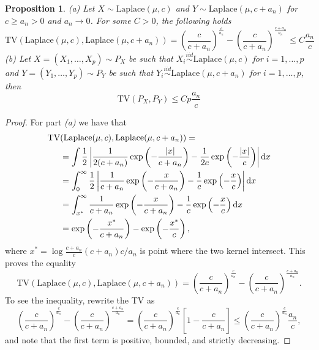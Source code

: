 \documentclass{article}
\newtheorem{proposition}{Proposition}
\theoremstyle{definition}
\newcommand{\iidsim}{\overset{iid}{\sim}} %
\newcommand{\di}{{\rm d}}
\renewcommand{\&}{and}
\begin{document}
\begin{proposition}\label{prop:tv_laplace} \textit{(a)} Let $X\sim\text{Laplace}(\mu,c)$ and $Y\sim \text{Laplace}(\mu,c+a_n)$ for $c\geq a_n>0$ and $a_n \to 0$. For some $C>0$, the following holds
\[
\text{TV} (\text{Laplace}(\mu,c),\text{Laplace}(\mu,c+a_n)) = \left(\frac{c}{c+a_n}\right)^{\frac{c}{a_n}}-\left(\frac{c}{c+a_n}\right)^{\frac{c+a_n}{a_n}} \leq C\frac{a_n}{c}
\]  
\textit{(b)} Let $X=(X_1,\ldots, X_p) \sim P_X$ be such that $X_i\iidsim \text{Laplace}(\mu,c)$ for $i=1,\ldots,p$ and $Y=(Y_1,\ldots, Y_p)\sim P_Y$ be such that $Y_i\iidsim \text{Laplace}(\mu,c+a_n)$ for $i=1,\ldots,p$, then 
\[
\text{TV} (P_X,P_Y) \leq C p \frac{a_n}{c}
\]
\end{proposition}
\begin{proof} For part \textit{(a)} we have that
\begin{align*}
   \text{TV} &(\text{Laplace}(\mu,c),\text{Laplace}(\mu,c+a_n))  =\\
  & =\int\frac{1}{2}\left\vert \frac{1}{2 (c+a_n)} \exp\left( -\frac{|x|}{c+a_n}  \right) - \frac{1}{2 c} \exp\left( -\frac{|x|}{c}  \right) \right\vert \di x \\
   &=\int_0^{\infty}\frac{1}{2}\left\vert \frac{1}{ c+a_n} \exp\left( -\frac{x}{c+a_n}  \right) - \frac{1}{ c} \exp\left( -\frac{x}{c}  \right) \right\vert \di x\\
   &=\int_{x^*}^{\infty} \frac{1}{c+a_n} \exp\left( -\frac{x}{c+a_n}  \right) - \frac{1}{ c} \exp\left( -\frac{x}{c}  \right) \di x \\
   &=\exp\left( -\frac{x^*}{c+a_n} \right) - \exp\left( -\frac{x^*}{c}  \right),
\end{align*}
where $x^*=\log\frac{c+a_n}{c}(c+a_n)c/a_n$ is point where the two kernel intersect. This proves the equality
\[
\text{TV} (\text{Laplace}(\mu,c),\text{Laplace}(\mu,c+a_n)) = \left(\frac{c}{c+a_n}\right)^{\frac{c}{a_n}}-\left(\frac{c}{c+a_n}\right)^{\frac{c+a_n}{a_n}}.
\]
To see the inequality, rewrite the TV as 
\[
\left(\frac{c}{c+a_n}\right)^{\frac{c}{a_n}}-\left(\frac{c}{c+a_n}\right)^{\frac{c+a_n}{a_n}}=\left(\frac{c}{c+a_n}\right)^{\frac{c}{a_n}}\left[1 - \frac{c}{c+a_n}\right] \leq \left(\frac{c}{c+a_n}\right)^{\frac{c}{a_n}} \frac{a_n}{c},
\]
and note that the first term is positive, bounded, and strictly decreasing. 


\end{proof}
\end{document}
